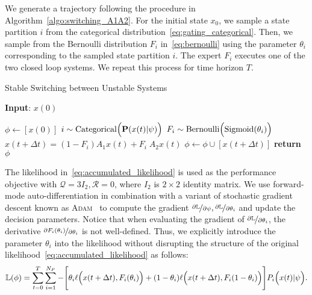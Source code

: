 We generate a trajectory following the procedure in
Algorithm~\eqref{algo:switching_A1A2}.
%
For the initial state $x_0$, we sample a state partition $i$ from the
categorical distribution~\eqref{eq:gating_categorical}.
%
Then, we sample from the Bernoulli distribution $F_i$ in~\eqref{eq:bernoulli} using the
parameter $\theta_i$ corresponding to the sampled state partition $i$.
%
The expert $F_i$ executes one of the two closed loop systems.
%
We repeat this process for time horizon $T$.

\begin{algorithm}
      \caption{Stable Switching between Unstable Systems}
      \label{algo:switching_A1A2}
      \small
      \hspace*{\algorithmicindent} \textbf{Input}: $x(0)$
      \begin{algorithmic}[1]
        \State $\phi \leftarrow  [x(0)]$ 
              \State $i \sim \text{Categorical}\Bigl(\mathbf{P}(x(t)| \psi)\Bigr)$ 
              \State $F_i \sim \text{Bernoulli} \Bigl(\textrm{Sigmoid}(\theta_i) \Bigr)$      
              \State $x(t+\Delta t) = (1-F_i)A_1x(t) + F_i \; A_2x(t) $
              \State $\phi \leftarrow \phi \cup [x(t+\Delta t)]$
            \EndFor
          \State \textbf{return} $\phi$
      \end{algorithmic}
  \end{algorithm}
  
%
{\color{red} The likelihood in~\eqref{eq:accumulated_likelihood} is used as the
performance objective with $\mathcal{Q} = 3I_2, \mathcal{R} = 0$, where $I_2$
is $2 \times 2$ identity matrix.
%
We use forward-mode auto-differentiation in combination with a variant of
stochastic gradient descent known as \textsc{Adam}~\cite{kingma2014adam} to
compute the gradient $\nicefrac{\partial \mathbb{L}}{\partial \psi},
\nicefrac{\partial \mathbb{L}}{\partial \theta_i}$ and update the decision
parameters.
%
Notice that when evaluating the gradient of $\nicefrac{\partial
\mathbb{L}}{\partial \theta_i}$, the derivative $\nicefrac{\partial
F_i(\theta_i)}{\partial \theta_i}$ is not well-defined.
%
Thus, we explicitly introduce the parameter $\theta_i$ into the likelihood
without disrupting the structure of the original
likelihood~\eqref{eq:accumulated_likelihood} as follows:
\begin{align*}
    \mathbb{L}(\phi) = \sum_{t=0}^{T}  \sum_{i=1}^{N_F} - \Biggl[\theta_i \ell \Bigl(x(t + \Delta t), F_i(\theta_i) \Bigr) + (1- \theta_i)\ell \Bigl(x(t + \Delta t), F_i(1-\theta_i) \Bigr) \Biggr] P_i\Bigl(x(t)| \psi \Bigr)  .
\end{align*}
}

